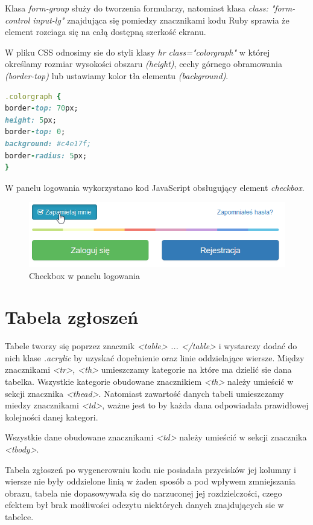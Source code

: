 \documentclass[openright]{xmgr}
\begin{document}
Klasa \textit{form-group} służy do tworzenia formularzy, natomiast klasa \textit{class: "form-control input-lg"} znajdująca się pomiedzy znacznikami kodu Ruby sprawia że element rozciaga się na całą dostępną szerkość ekranu.

W pliku CSS odnosimy sie do styli klasy  \textit{hr class="colorgraph"} w której określamy rozmiar wysokości obszaru \textit{(height)}, cechy górnego obramowania \textit{(border-top)} lub ustawiamy kolor tła elementu \textit{(background)}.
\begin{lstlisting}[language=Ruby,lineskip={-1pt},caption=Kod CSS dla panelu logowania]
.colorgraph {
border-top: 70px;
height: 5px;
border-top: 0;
background: #c4e17f;
border-radius: 5px;
}
\end{lstlisting}

W panelu logowania wykorzystano kod JavaScript obsługujący element \textit{checkbox}.\\

\begin{figure}[!tbh]
	\centering
	\includegraphics[width=\linewidth]{image/checkbox}
	\caption{Checkbox w panelu logowania}
\end{figure}	
	
	\section{Tabela zgłoszeń}
	Tabele tworzy się poprzez znacznik \textit{<table> ... </table>} i wystarczy dodać do nich klase \textit{.acrylic} by uzyskać dopełnienie oraz linie oddzielające wiersze. Między znacznikami \textit{<tr>, <th>} umieszczamy kategorie na które ma dzielić sie dana tabelka. Wszystkie kategorie obudowane znacznikiem \textit{<th>} należy umieścić w sekcji znacznika \textit{<thead>}. Natomiast zawartość danych tabeli umieszczamy miedzy znacznikami \textit{<td>}, ważne jest to by każda dana odpowiadała prawidłowej kolejności danej kategori.
	
	Wszystkie dane obudowane znacznikami \textit{<td>} należy umieścić w sekcji znacznika \textit{<tbody>}.  
	
	Tabela zgłoszeń po wygenerowniu kodu nie posiadała przycisków jej kolumny i wiersze nie były oddzielone linią w żaden sposób a pod wpływem zmniejszania obrazu, tabela nie dopasowywała się do narzuconej jej rozdzielczości, czego efektem był brak możliwości odczytu niektórych danych znajdujących sie w tabelce. 
	
\end{document}
